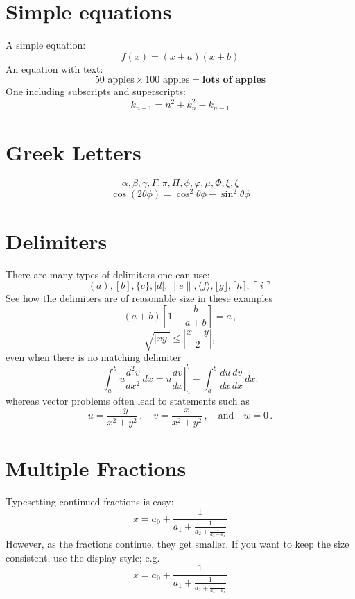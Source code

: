 \section{Simple equations}
A simple equation:
\[
    f(x)=(x+a)(x+b)
\]
An equation with text:
\begin{equation}
    50 \text{ apples} \times 100 \text{ apples} =
    \textbf{lots of apples}
\end{equation}
One including subscripts and superscripts:
\[ k_{n+1} = n^2 + k_n^2 - k_{n-1} \]

\section{Greek Letters}
\[ \alpha, \beta, \gamma, \Gamma, \pi, \Pi, \phi, \varphi, \mu, \Phi, \xi, \zeta \]
\[ \cos(2\theta\phi) = \cos^2 \theta\phi - \sin^2 \theta\phi \]

\section{Delimiters}
There are many types of delimiters one can use:
\[ ( a ), [ b ], \{ c \}, | d |, \| e \|,
    \langle f \rangle, \lfloor g \rfloor,
    \lceil h \rceil, \ulcorner i \urcorner \]
See how the delimiters are of reasonable size in these examples
\[
    \left(a+b\right)\left[1-\frac{b}{a+b}\right]=a\,,
\]
\[
    \sqrt{|xy|}\leq\left|\frac{x+y}{2}\right|,
\]
even when there is no matching delimiter
\[
    \int_a^bu\frac{d^2v}{dx^2}\,dx
    =\left.u\frac{dv}{dx}\right|_a^b
    -\int_a^b\frac{du}{dx}\frac{dv}{dx}\,dx.
\]
whereas vector problems often lead to statements such as
\[
    u=\frac{-y}{x^2+y^2}\,,\quad
    v=\frac{x}{x^2+y^2}\,,\quad\text{and}\quad
    w=0\,.
\]

\section{Multiple Fractions}
Typesetting continued fractions is easy:
\[
    x = a_0 + \frac{1}{a_1 + \frac{1}{a_2 + \frac{1}{a_3 + a_4}}}
\]
However, as the fractions continue, they get smaller. If you want to keep the size consistent, use the display style; e.g.
\[
    x = a_0 + \frac{1}{\displaystyle a_1
        + \frac{1}{\displaystyle a_2
            + \frac{1}{\displaystyle a_3 + a_4}}}
\]

